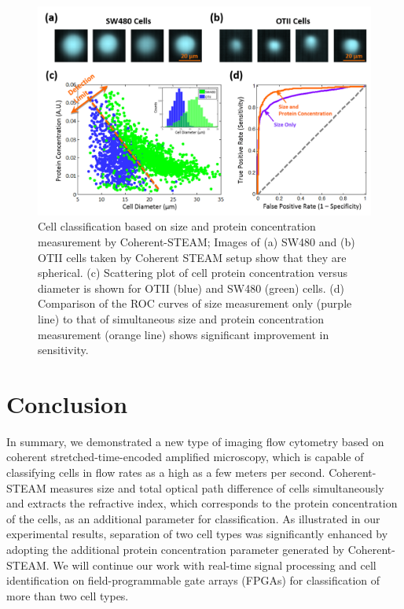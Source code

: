 \begin{figure}[htb!]
\centering
\includegraphics[scale=0.65]{BOE2013/Figure4.png}
\caption{Cell classification based on size and protein concentration measurement by Coherent-STEAM; Images of (a) SW480 and (b) OTII cells taken by Coherent STEAM setup show that they are spherical. (c) Scattering plot of cell protein concentration versus diameter is shown for OTII (blue) and SW480 (green) cells. (d) Comparison of the ROC curves of size measurement only (purple line) to that of simultaneous size and protein concentration measurement (orange line) shows significant improvement in sensitivity.}
\label{fig:BOE2013_Figure4}
\end{figure}

\section{Conclusion}

In summary, we demonstrated a new type of imaging flow cytometry based on coherent stretched-time-encoded amplified microscopy, which is capable of classifying cells in flow rates as a high as a few meters per second. Coherent-STEAM measures size and total optical path difference of cells simultaneously and extracts the refractive index, which corresponds to the protein concentration of the cells, as an additional parameter for classification. As illustrated in our experimental results, separation of two cell types was significantly enhanced by adopting the additional protein concentration parameter generated by Coherent-STEAM. We will continue our work with real-time signal processing and cell identification on field-programmable gate arrays (FPGAs) for classification of more than two cell types.
